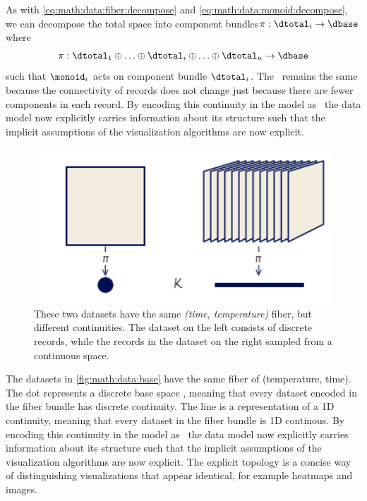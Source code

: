 \documentclass[../main.tex]{subfiles}
\begin{document}
As with \autoref{eq:math:data:fiber:decompose} and \autoref{eq:math:data:monoid:decompose}, we can decompose the total space into component bundles$\pi:\dtotal_i\rightarrow \dbase$ where
\begin{equation}
    \label{eq:math:data:base:decompose}
    \pi:\dtotal_1\oplus\ldots\oplus \dtotal_i \oplus\ldots \oplus \dtotal_n \rightarrow \dbase
\end{equation}
such that \(\monoid_{i}\) acts on component bundle \(\dtotal_i\). The \dbase\ remains the same because the connectivity of records does not change just because there are fewer components in each record. By encoding this continuity in the model as \dbase\, the data model now explicitly carries information about its structure such that the implicit assumptions of the visualization algorithms are now explicit.
\begin{figure}[H]
    \includegraphics[width=1\textwidth]{figures/math/base.png}
    \caption{These two datasets have the same \textit{(time, temperature)} fiber, but different continuities. The dataset on the left consists of discrete records, while the records in the dataset on the right sampled from a continuous space.} 
    \label{fig:math:data:base}
\end{figure}

The datasets in \autoref{fig:math:data:base} have the same fiber of (temperature, time). The dot represents a discrete base space \dbase, meaning that every dataset encoded in the fiber bundle has discrete continuity. The line is a representation of a 1D continuity, meaning that every dataset in the fiber bundle is 1D continous. By encoding this continuity in the model as \dbase\, the data model now explicitly carries information about its structure such that the implicit assumptions of the visualization algorithms are now explicit. The explicit topology is a concise way of distinguishing visualizations that appear identical, for example heatmaps and images.  
 
\end{document}
